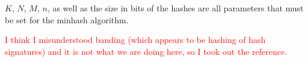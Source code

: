 \documentclass[letterpaper]{article}
\newcommand{\red}[1]{\textcolor{red}{#1}}
\begin{document}
$K$, $N$, $M$, $n$, as well as the size in bits of the
hashes are all parameters that must be set for the minhash algorithm.

\red{I think I misunderstood banding (which appears to be hashing of
  hash signatures) and it is not what we are doing here, so I took out
  the reference.}





\end{document}
